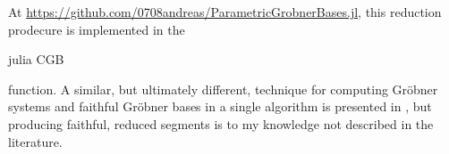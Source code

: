 \begin{remark}
  At \url{https://github.com/0708andreas/ParametricGrobnerBases.jl}, this reduction prodecure is implemented in the \begin{mintinline}{julia} CGB \end{mintinline} function. A similar, but ultimately different, technique for computing Gröbner systems and faithful Gröbner bases in a single algorithm is presented in \cite{10.1145/1993886.1993918}, but producing faithful, reduced segments is to my knowledge not described in the literature.
\end{remark}
